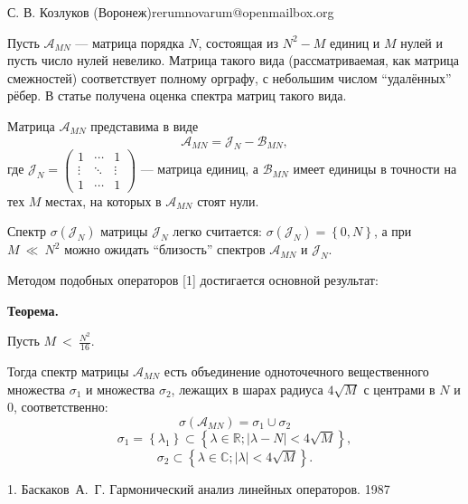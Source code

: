 \documentclass{article}
\begin{document}
{С. В. Козлуков}
{}{ (Воронеж)}{rerumnovarum@openmailbox.org}

Пусть \( \mathcal{A}_{MN} \) --- матрица порядка \( N \),
состоящая из \( N^2 - M \) единиц и \( M \) нулей
и пусть число нулей невелико.
Матрица такого вида (рассматриваемая, как матрица смежностей) соответствует
полному орграфу, с небольшим числом ``удалённых'' рёбер.
В статье получена оценка спектра
матриц такого вида.

Матрица \( \mathcal{A}_{MN} \) представима в виде
\[
    \mathcal{A}_{MN} = \mathcal{J}_{N} - \mathcal{B}_{MN},
    \]
где \(
\mathcal{J}_{N} =
\begin{pmatrix}1 & \cdots & 1 \\
\vdots & \ddots & \vdots \\
1 & \cdots & 1
\end{pmatrix} \) --- матрица единиц,
а \( \mathcal{B}_{MN} \) имеет единицы в точности на тех \( M \)
местах, на которых в \( \mathcal{A}_{MN} \) стоят нули.

Спектр \( \sigma(\mathcal{J}_{N}) \) матрицы \( \mathcal{J}_{N} \) легко считается:
\( \sigma\left({\mathcal{J}_{N}}\right) = \left\{0, N \right\} \),
а при \( M~\ll~N^2 \) можно ожидать ``близость'' спектров
\( \mathcal{A}_{MN} \) и \( \mathcal{J}_{N} \).

Методом подобных операторов [1]
достигается основной результат:

\textbf{Теорема.}
\begin{center}\relax
    Пусть
    \(M~<~\displaystyle{\frac{N^2}{16}}. \)

Тогда спектр матрицы \( \mathcal{A}_{MN} \) есть объединение
    одноточечного вещественного множества \( \sigma_1 \)
    и множества \( \sigma_2 \),
    лежащих в шарах
    радиуса \( 4\sqrt{M} \)
    с центрами в \( N \) и \( 0 \), соответственно:
    \[ \sigma\left(\mathcal{A}_{MN}\right) = \sigma_1 \cup \sigma_2 \]
    \[ \sigma_1 = \left\{\lambda_1 \right\}
        \subset \left\{\lambda\in\mathbb{R}; \lvert \lambda - N \rvert < 4\sqrt{M} \right\}, \]
    \[ \sigma_2
        \subset \left\{ \lambda\in\mathbb{C}; \lvert \lambda \rvert < 4\sqrt{M} \right\}. \]
\end{center}

\liter

1. Баскаков~А.~Г. Гармонический анализ линейных операторов. 1987
\end{document}
